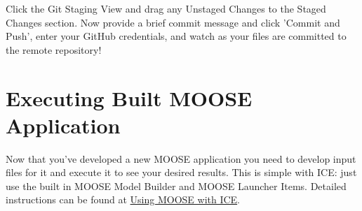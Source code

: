 Click the Git Staging View and drag any Unstaged Changes to the Staged
Changes section. Now provide a brief commit message and click 'Commit
and Push', enter your GitHub credentials, and watch as your files are
committed to the remote repository!

\section{Executing Built MOOSE
Application}\label{executing-built-moose-application}

Now that you've developed a new MOOSE application you need to develop
input files for it and execute it to see your desired results. This is
simple with ICE: just use the built in MOOSE Model Builder and MOOSE
Launcher Items. Detailed instructions can be found at
\href{Using MOOSE with ICE}{Using MOOSE with ICE}.
